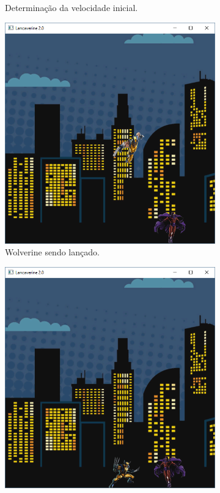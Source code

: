 \begin{renumerate}
\begin{figure}[H]
\begin{subfigure}[t]{0.25\textwidth}
        \caption{Determinação da velocidade inicial.}
        \label{fig:cap03_ex27b}
    \end{subfigure}
    \hfill
    \begin{subfigure}[t]{0.25\textwidth}
        \centerline{\includegraphics[width=.9\textwidth]{img/cap3_ex27c}}
        \caption{Wolverine sendo lançado.}
        \label{fig:cap03_ex27c}
    \end{subfigure}
    \hfill
    \begin{subfigure}[t]{0.25\textwidth}
        \centerline{\includegraphics[width=.9\textwidth]{img/cap3_ex27d}}

\end{subfigure}
\end{figure}
\end{renumerate}

